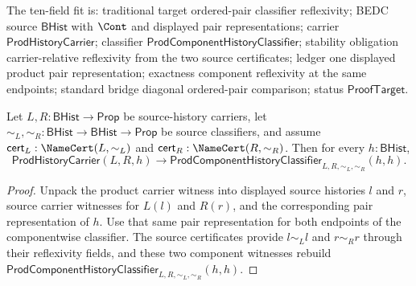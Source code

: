 \begin{theorem}
\label{thm:prod-component-history-classifier-carrier-reflexivity-from-source-certificates}
The ten-field fit is: traditional target ordered-pair classifier reflexivity;
BEDC source $\mathsf{BHist}$ with $\Cont$ and displayed pair representations;
carrier $\mathsf{ProdHistoryCarrier}$; classifier
$\mathsf{ProdComponentHistoryClassifier}$; stability obligation
carrier-relative reflexivity from the two source certificates; ledger one
displayed product pair representation; exactness component reflexivity at the
same endpoints; standard bridge diagonal ordered-pair comparison; status
$\mathsf{ProofTarget}$.

Let $L,R:\mathsf{BHist}\to\mathsf{Prop}$ be source-history carriers, let
$\sim_L,\sim_R:\mathsf{BHist}\to\mathsf{BHist}\to\mathsf{Prop}$ be source
classifiers, and assume $\mathsf{cert}_L:\NameCert(L,\sim_L)$ and
$\mathsf{cert}_R:\NameCert(R,\sim_R)$. Then for every $h:\mathsf{BHist}$,
$$
\mathsf{ProdHistoryCarrier}(L,R,h)\to
\mathsf{ProdComponentHistoryClassifier}_{L,R,\sim_L,\sim_R}(h,h).
$$
\end{theorem}
\begin{proof}
Unpack the product carrier witness into displayed source histories $l$ and
$r$, source carrier witnesses for $L(l)$ and $R(r)$, and the corresponding
pair representation of $h$. Use that same pair representation for both
endpoints of the componentwise classifier. The source certificates provide
$l\sim_L l$ and $r\sim_R r$ through their reflexivity fields, and these two
component witnesses rebuild
$\mathsf{ProdComponentHistoryClassifier}_{L,R,\sim_L,\sim_R}(h,h)$.
\end{proof}

